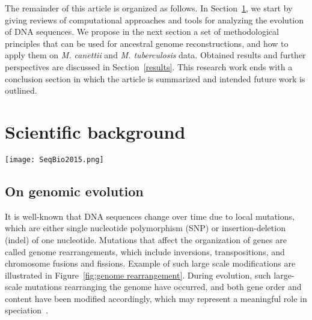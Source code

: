 \documentclass[runningheads,a4paper]{llncs}
\begin{document}
The remainder of this article is organized as follows. 
In Section~\ref{Background}, we start by giving reviews of computational approaches and tools for analyzing the evolution of DNA sequences. %
We propose in the next section a set of methodological principles that can be used for ancestral genome reconstructions, and how to apply them on \textit{M. canettii} and \textit{M. tuberculosis} data. Obtained results and further perspectives are discussed in Section~\ref{results}. This research work ends with a conclusion section in which the article is summarized and intended future work is outlined.
 
 
 \section{Scientific background}\label{Background} 
 
 
 
\begin{figure*}
\centering
\texttt{[image: SeqBio2015.png]}
\caption{Various genome rearrangement events.} 
\label{fig:genome rearrangement}
\end{figure*}

\subsection{On genomic evolution}
It is well-known that DNA sequences change over time due to local mutations, which are either single nucleotide polymorphism (SNP) or insertion-deletion (indel) of one nucleotide.
Mutations that affect the organization of genes are called genome rearrangements, 
which include inversions, transpositions, and chromosome fusions and fissions. %
Example of such large scale modifications are illustrated in Figure~\ref{fig:genome rearrangement}.
During evolution, such large-scale mutations rearranging the genome have occurred, and both gene order and content have been modified accordingly, which may
represent a meaningful role in speciation~\cite{fertin2009combinatorics}. 
\end{document}
